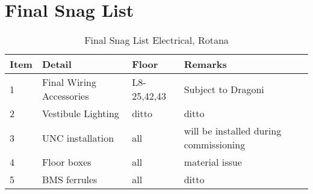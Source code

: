 \begin{comment}
Lvl 21  & 14 Aug   &14 Aug  & 14 Aug        &14 Aug         &\done \\
Lvl 20  & 16 Aug   &16 Aug          &16 Aug         &16 Aug         &30 Jul\\
Lvl 19  & 18 Aug   &18 Aug           &18 Aug         &18 Aug         &1 Aug\\
Lvl 18  & 21 Aug   &21 Aug & 21 Aug                  &21 Aug         &3 Aug\\
Lvl 17  & 23 Aug   &23 Aug  &23 Aug         &23 Aug         &5 Aug\\
Lvl 16  & 25 Aug   &25 Aug  &25 Aug         &25 Aug         &7 Aug\\
Lvl 15  & 27 Aug   &27 Aug  &27 Aug         &27 Aug         &9 Aug\\
Lvl 14  & 30 Aug   &30 Aug  &30 Aug         &30 Aug         &11 Aug\\
Lvl 13  & 1 Sep     &1 Sep    &1 Sep         &1 Sep         &13 Aug\\
Lvl 12  & 4 Sep     &4 Sep    & 4 Sep        &4 Sep         &15 Aug\\
Lvl 11  & 6 Sep     &6 Sep    & 6 Sep        &6 Sep         &17 Aug\\
Lvl 10  & 8 Sep     &8 Sep    & 8 Sep        &8 Sep         &19 Aug\\
Lvl 09  & 10 Sep   &10 Sep   & 11 Sep        &11 Sep         &21 Aug\\
Lvl 08  & 12 Sep   &12 Sep   & 13 Sep        &13 Sep         &23 Aug\\
Lvl 07  & 15 Sep   &15 Sep   & 15 Sep        &15 Sep         &25 Aug\\
\bottomrule
\end{tabular}
\normalsize
\end{table}

\end{comment}


\section{Final Snag List}

\begin{table}[htbp]
\begin{tabular}{lllp{4.5cm}}
\toprule
Item &Detail &Floor  & Remarks\\
\midrule
1 &Final Wiring Accessories &L8-25,42,43 & Subject to Dragoni \\
2 &Vestibule Lighting       & ditto      &      ditto\\
3 &UNC installation         & all        & will be installed during commissioning\\
4  &Floor boxes              &all         &material issue\\
5  &BMS ferrules             &all         & ditto\\
\bottomrule
\end{tabular}
\caption{Final Snag List Electrical, Rotana}
\end{table}

